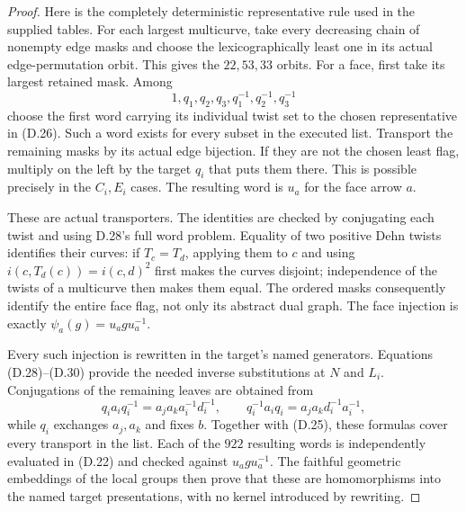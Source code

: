 \begin{proof}
Here is the completely deterministic representative
rule used in the supplied tables.  For each largest
multicurve, take every decreasing chain of nonempty
edge masks and choose the lexicographically least one
in its actual edge-permutation orbit.  This gives the
$22,53,33$ orbits.  For a face, first take its largest
retained mask.  Among
\[
             1,q_1,q_2,q_3,q_1^{-1},q_2^{-1},q_3^{-1}
\]
choose the first word carrying its individual twist
set to the chosen representative in (D.26).
Such a word exists for every subset in the executed
list.  Transport the remaining masks by its actual
edge bijection.  If they are not the chosen least
flag, multiply on the left by the target $q_i$ that
puts them there.  This is possible precisely in the
$C_i,E_i$ cases.  The resulting word is $u_a$ for the
face arrow $a$.

These are actual transporters.  The identities are
checked by conjugating each twist and using D.28's
full word problem.  Equality of two positive Dehn
twists identifies their curves: if $T_c=T_d$, applying
them to $c$ and using
$i(c,T_d(c))=i(c,d)^2$ first makes the curves disjoint;
independence of the twists of a multicurve then makes
them equal.  The ordered masks consequently identify
the entire face flag, not only its abstract dual graph.
The face injection is exactly
$\psi_a(g)=u_a g u_a^{-1}$.

Every such injection is rewritten in the target's
named generators.  Equations (D.28)--(D.30) provide the
needed inverse substitutions at $N$ and $L_i$.
Conjugations of the remaining leaves are obtained from
\[
 q_i a_i q_i^{-1}=a_ja_k a_i^{-1}d_i^{-1},\qquad
 q_i^{-1}a_iq_i=a_ja_k d_i^{-1}a_i^{-1},
\]
while $q_i$ exchanges $a_j,a_k$ and fixes $b$.
Together with (D.25), these formulas cover every
transport in the list.  Each of the $922$ resulting
words is independently evaluated in (D.22) and
checked against $u_a g u_a^{-1}$.  The faithful
geometric embeddings of the local groups then prove
that these are homomorphisms into the named target
presentations, with no kernel introduced by rewriting.


\end{proof}
